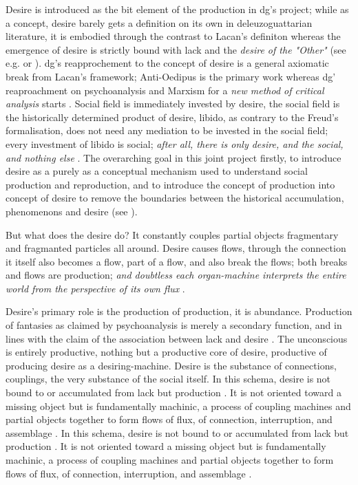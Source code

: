 Desire is introduced as the bit element of the production in \gls{dg}'s
project; while as a concept, desire barely gets a definition on its own in deleuzoguattarian literature, it is embodied through the contrast to Lacan's definiton whereas the emergence of desire is strictly bound with lack and the \textit{desire of the "Other"} (see e.g. \cite[235]{lacan1998} or \cite[343]{lacan2006}). \Gls{dg}'s reapprochement to the concept of desire is a general axiomatic break from Lacan's framework; Anti-Oedipus \parencite*[]{deleuze1983} is the primary work whereas \gls{dg}' reaproachment on psychoanalysis and Marxism for a \textit{new method of critical analysis} starts \parencite[39]{buchanan2008b}. Social field is immediately invested by desire, the social field is the historically determined product of desire, libido, as contrary to the Freud's formalisation, does not need any mediation to be invested in the social field; every investment of libido is social; \textit{after all, there is only desire, and the social, and nothing else} \parencite[5]{deleuze1983}. The overarching goal in this joint project firstly, to introduce desire as a purely as a conceptual mechanism used to understand social production and reproduction, and to introduce the concept of production into concept of desire to remove the boundaries between the historical accumulation, phenomenons and desire (see \cite[39-42]{buchanan2008b}).

But what does the desire do? It constantly couples partial objects fragmentary
and fragmanted particles all around. Desire causes flows, through the
connection it itself also becomes a flow, part of  a flow, and also break the
flows;  both breaks and flows are production; \textit{and doubtless each organ-machine interprets the entire world from the perspective of its own flux} \parencite[5]{deleuze1983}.

Desire's primary role is the production of production, it is abundance. Production of fantasies as claimed by psychoanalysis is merely a secondary function, and in lines with the claim of the association between lack and desire \parencite[49]{buchanan2008b}. The unconscious is entirely productive, nothing but a productive core of desire, productive of producing desire as a desiring-machine. Desire is the substance of connections, couplings, the very substance of the social itself. In this schema, desire is not bound to or accumulated from lack but production \parencite[26]{deleuze1983}. It is not oriented toward a missing object but is fundamentally machinic, a process of coupling machines and partial objects together to form flows of flux, of connection, interruption, and assemblage \parencite[5]{deleuze1983}. In this schema, desire is not bound to or accumulated from lack but production \parencite[26]{deleuze1983}. It is not oriented toward a missing object but is fundamentally machinic, a process of coupling machines and partial objects together to form flows of flux, of connection, interruption, and assemblage \parencite[5]{deleuze1983}.


